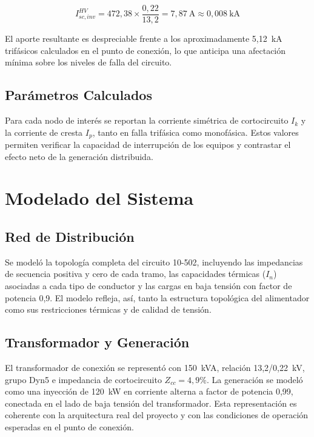 \begin{equation}
I_{sc,inv}^{HV} = 472{,}38\times\frac{0{,}22}{13{,}2} = 7{,}87~\text{A} \approx 0{,}008~\text{kA}
\end{equation}

El aporte resultante es despreciable frente a los aproximadamente 5,12~kA trifásicos calculados en el punto de conexión, lo que anticipa una afectación mínima sobre los niveles de falla del circuito.

\subsection{Parámetros Calculados}

Para cada nodo de interés se reportan la corriente simétrica de cortocircuito $I_k$ y la corriente de cresta $I_p$, tanto en falla trifásica como monofásica. Estos valores permiten verificar la capacidad de interrupción de los equipos y contrastar el efecto neto de la generación distribuida.

\section{Modelado del Sistema}

\subsection{Red de Distribución}

Se modeló la topología completa del circuito 10-502, incluyendo las impedancias de secuencia positiva y cero de cada tramo, las capacidades térmicas ($I_n$) asociadas a cada tipo de conductor y las cargas en baja tensión con factor de potencia 0,9. El modelo refleja, así, tanto la estructura topológica del alimentador como sus restricciones térmicas y de calidad de tensión.

\subsection{Transformador y Generación}

El transformador de conexión se representó con 150~kVA, relación 13,2/0,22~kV, grupo Dyn5 e impedancia de cortocircuito $Z_{cc}=4{,}9\%$. La generación se modeló como una inyección de 120~kW en corriente alterna a factor de potencia 0,99, conectada en el lado de baja tensión del transformador. Esta representación es coherente con la arquitectura real del proyecto y con las condiciones de operación esperadas en el punto de conexión.

